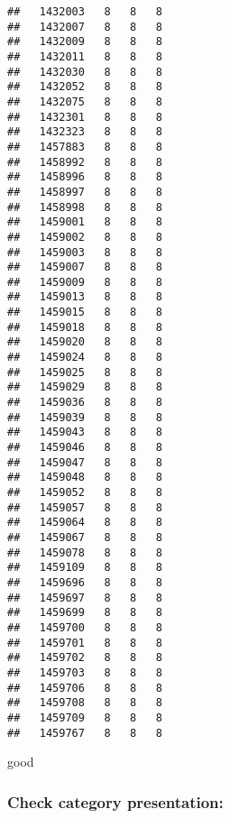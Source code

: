 \documentclass[
]{article}
\newenvironment{Shaded}{\begin{snugshade}}{\end{snugshade}}
\newcommand{\DataTypeTok}[1]{\textcolor[rgb]{0.13,0.29,0.53}{#1}}
\newcommand{\KeywordTok}[1]{\textcolor[rgb]{0.13,0.29,0.53}{\textbf{#1}}}
\newcommand{\NormalTok}[1]{#1}
\newcommand{\OperatorTok}[1]{\textcolor[rgb]{0.81,0.36,0.00}{\textbf{#1}}}
\newcommand{\OtherTok}[1]{\textcolor[rgb]{0.56,0.35,0.01}{#1}}
\newcommand{\StringTok}[1]{\textcolor[rgb]{0.31,0.60,0.02}{#1}}
\begin{document}
\begin{verbatim}
##   1432003   8   8   8
##   1432007   8   8   8
##   1432009   8   8   8
##   1432011   8   8   8
##   1432030   8   8   8
##   1432052   8   8   8
##   1432075   8   8   8
##   1432301   8   8   8
##   1432323   8   8   8
##   1457883   8   8   8
##   1458992   8   8   8
##   1458996   8   8   8
##   1458997   8   8   8
##   1458998   8   8   8
##   1459001   8   8   8
##   1459002   8   8   8
##   1459003   8   8   8
##   1459007   8   8   8
##   1459009   8   8   8
##   1459013   8   8   8
##   1459015   8   8   8
##   1459018   8   8   8
##   1459020   8   8   8
##   1459024   8   8   8
##   1459025   8   8   8
##   1459029   8   8   8
##   1459036   8   8   8
##   1459039   8   8   8
##   1459043   8   8   8
##   1459046   8   8   8
##   1459047   8   8   8
##   1459048   8   8   8
##   1459052   8   8   8
##   1459057   8   8   8
##   1459064   8   8   8
##   1459067   8   8   8
##   1459078   8   8   8
##   1459109   8   8   8
##   1459696   8   8   8
##   1459697   8   8   8
##   1459699   8   8   8
##   1459700   8   8   8
##   1459701   8   8   8
##   1459702   8   8   8
##   1459703   8   8   8
##   1459706   8   8   8
##   1459708   8   8   8
##   1459709   8   8   8
##   1459767   8   8   8
\end{verbatim}

good

\begin{Shaded}
\end{Shaded}

\hypertarget{check-category-presentation}{%
\subsubsection{Check category
presentation:}\label{check-category-presentation}}

\begin{Shaded}
\end{Shaded}
\end{document}
